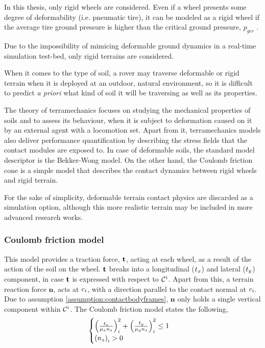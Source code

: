 In this thesis, only rigid wheels are considered. Even if a wheel presents some degree of deformability (i.e. pneumatic tire), it can be modeled as a rigid wheel if the average tire ground pressure is higher than the critical ground pressure, $p_{gcr}$ \cite{chapter24handbookrobotics}.

\begin{assumption}
Due to the impossibility of mimicing deformable ground dynamics in a real-time simulation test-bed, only rigid terrains are considered.
\end{assumption}

When it comes to the type of soil, a rover may traverse deformable or rigid terrain when it is deployed at an outdoor, natural environment, so it is difficult to predict \textit{a priori} what kind of soil it will be traversing as well as its properties.

The theory of terramechanics focuses on studying the mechanical properties of soils and to assess its behaviour, when it is subject to deformation caused on it by an external agent with a locomotion set. Apart from it, terramechanics models also deliver performance quantification by describing the stress fields that the contact modules are exposed to. In case of deformable soils, the standard model descriptor is the Bekker-Wong model. On the other hand, the Coulomb friction cone is a simple model that describes the contact dynamics between rigid wheels and rigid terrain.

For the sake of simplicity, deformable terrain contact physics are discarded as a simulation option, although this more realistic terrain may be included in more advanced research works.

\subsubsection*{Coulomb friction model}
\label{subsubsection:coulombFrictionModel}

This model provides a traction force, $\mathbf{t}$, acting at each wheel, as a result of the action of the soil on the wheel. $\mathbf{t}$ breaks into a longitudinal ($t_x$) and lateral ($t_y$) component, in case $\mathbf{t}$ is expressed with respect to $\mathcal{C}^i$. Apart from this, a terrain reaction force $\mathbf{n}$, acts at $c_i$, with a direction parallel to the contact normal at $c_i$. Due to assumption \ref{assumption:contactbodyframes}, $\mathbf{n}$ only holds a single vertical component within $\mathcal{C}^i$. The Coulomb friction model \cite{chapter24handbookrobotics} states the following,
\begin{equation}
	\begin{cases}
		\left(\frac{t_x}{\mu_x n_z} \right)_i^2 + \left( \frac{t_y}{\mu_y n_z} \right)_i^2 \leq 1\\
		\left( n_z \right)_i > 0
	\end{cases}
	\label{eq:coulombFrictionModel}
\end{equation}

